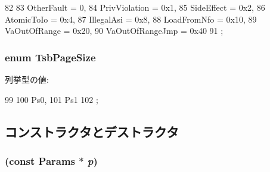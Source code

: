 \begin{DoxyCode}
82                     {
83         OtherFault = 0,
84         PrivViolation = 0x1,
85         SideEffect = 0x2,
86         AtomicToIo = 0x4,
87         IllegalAsi = 0x8,
88         LoadFromNfo = 0x10,
89         VaOutOfRange = 0x20,
90         VaOutOfRangeJmp = 0x40
91     };
\end{DoxyCode}
\hypertarget{classSparcISA_1_1TLB_a639a136c8fa30e45275bd7354e95eadd}{
\subsubsection[{TsbPageSize}]{\setlength{\rightskip}{0pt plus 5cm}enum {\bf TsbPageSize}}}
\label{classSparcISA_1_1TLB_a639a136c8fa30e45275bd7354e95eadd}
\begin{Desc}
\item[列挙型の値: ]\par
\begin{description}
\item[{\em 
\hypertarget{classSparcISA_1_1TLB_a639a136c8fa30e45275bd7354e95eadda3a7edc18be042f9f093c3c4fd03b6048}{
Ps0}
\label{classSparcISA_1_1TLB_a639a136c8fa30e45275bd7354e95eadda3a7edc18be042f9f093c3c4fd03b6048}
}]\item[{\em 
\hypertarget{classSparcISA_1_1TLB_a639a136c8fa30e45275bd7354e95eadda0955a6897849c661b0454ad02ad7f033}{
Ps1}
\label{classSparcISA_1_1TLB_a639a136c8fa30e45275bd7354e95eadda0955a6897849c661b0454ad02ad7f033}
}]\end{description}
\end{Desc}




\begin{DoxyCode}
99                      {
100         Ps0,
101         Ps1
102     };
\end{DoxyCode}


\subsection{コンストラクタとデストラクタ}
\hypertarget{classSparcISA_1_1TLB_acb886bd3c59f00c21be9ceaaf25dab97}{
\subsubsection[{TLB}]{ (const {\bf Params} $\ast$ {\em p})}}
\label{classSparcISA_1_1TLB_acb886bd3c59f00c21be9ceaaf25dab97}



